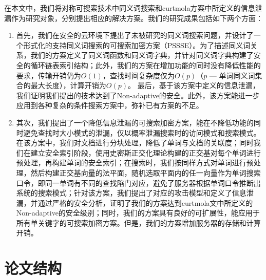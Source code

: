 在本文中，我们将对称可搜索技术中同义词搜索和curtmola方案中所定义的信息泄漏作为研究对象，分别提出相应的解决方案。我们的研究成果包括如下两个方面：
\begin{enumerate}
  \item
  首先，我们在安全的云环境下提出了未被研究的同义词搜索问题，并设计了一个形式化的支持同义词搜索的可搜索加密方案（PSSSE）。为了描述同义词关系，我们的方案定义了同义词函数和同义词字典，并针对同义词字典构建了安全的循环链表索引结构；此外，我们的方案在增加功能的同时没有降低性能的要求，传输开销仍为$O(1)$，查找时间复杂度仅为$O(p)$（$p$ --- 单词同义词集合的最大长度），计算开销为$O(p)$。 最后，基于该方案中定义的信息泄漏，我们证明我们提出的技术达到了Non-adaptive的安全。此外，该方案能进一步应用到各种复杂的条件搜索方案中，弥补已有方案的不足。

  \item
  其次，我们提出了一个降低信息泄漏的可搜索加密方案，能在不降低功能的同时避免查找时大小模式的泄漏，仅以概率泄漏搜索时的访问模式和搜索模式。在该方案中，我们对文档进行分块处理，降低了单词与文档的关联度；同时我们在建立安全索引阶段，使用史密斯正交化理论构建的正交基对每个单词进行预处理，再构建单词的安全索引；在搜索时，我们按同样方式对单词进行预处理，然后构建正交基向量的法平面，随机选取平面内的任一向量作为单词搜索口令，即同一单词有不同的查找陷门对应，避免了服务器根据单词口令推断出系统的搜索模式；针对该方案，我们提出了对应的攻击模型和定义了信息泄漏，并通过严格的安全分析，证明了我们的方案达到curtmola文中所定义的Non-adaptive的安全级别；同时，我们的方案具有良好的可扩展性，能应用于所有单关键字的可搜索加密方案。但是，我们的方案增加服务器的存储和计算开销。


\end{enumerate}


\section{论文结构}
\label{sec:introduction_thesisformat}

